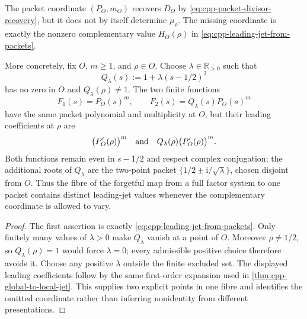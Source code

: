 \begin{proposition}
\label{prop:cpp-one-packet-information-loss}
The packet coordinate \((P_O,m_O)\) recovers \(D_O\) by
\eqref{eq:cpp-packet-divisor-recovery}, but it does not by itself determine
\(\mu_\rho\).  The missing coordinate is exactly the nonzero complementary
value \(H_O(\rho)\) in \eqref{eq:cpp-leading-jet-from-packets}.

More concretely, fix \(O\), \(m\geq1\), and \(\rho\in O\).  Choose
\(\lambda\in\mathbb R_{>0}\) such that
\[
 Q_\lambda(s):=1+\lambda(s-1/2)^2
\]
has no zero in \(O\) and \(Q_\lambda(\rho)\ne1\).  The two finite functions
\[
 F_1(s)=P_O(s)^m,
 \qquad
 F_2(s)=Q_\lambda(s)P_O(s)^m
\]
have the same packet polynomial and multiplicity at \(O\), but their leading
coefficients at \(\rho\) are
\[
 \bigl(P_O'(\rho)\bigr)^m
 \quad\hbox{and}\quad
 Q_\lambda(\rho)\bigl(P_O'(\rho)\bigr)^m.
\]
Both functions remain even in \(s-1/2\) and respect complex conjugation;
the additional roots of \(Q_\lambda\) are the two-point packet
\(\{1/2\pm\mathrm i/\sqrt\lambda\}\), chosen disjoint from \(O\).
Thus the fibre of the forgetful map from a full factor system to one packet
contains distinct leading-jet values whenever the complementary coordinate is
allowed to vary.
\end{proposition}

\begin{proof}
The first assertion is exactly
\cref{eq:cpp-leading-jet-from-packets}.  Only finitely many values of
\(\lambda>0\) make \(Q_\lambda\) vanish at a point of \(O\).  Moreover
\(\rho\ne1/2\), so \(Q_\lambda(\rho)=1\) would force \(\lambda=0\); every
admissible positive choice therefore avoids it.  Choose any positive
\(\lambda\) outside the finite excluded set.
The displayed leading coefficients follow by the same first-order expansion
used in \cref{thm:cpp-global-to-local-jet}.  This supplies two explicit points
in one fibre and identifies the omitted coordinate rather than inferring
nonidentity from different presentations.
\end{proof}

